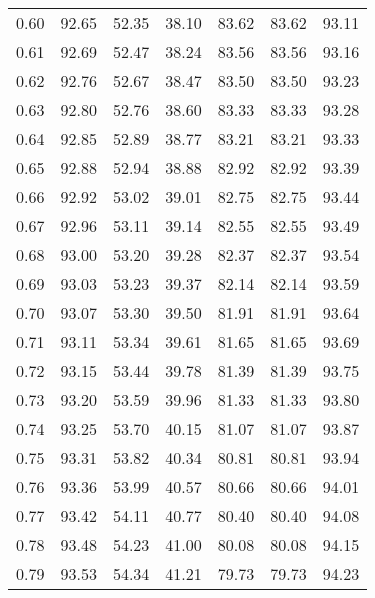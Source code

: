 \begin{tabular}{|c|c|c|c|c|c|c|}
      0.60 &     92.65 &     52.35 &      38.10 &   83.62 &      83.62 &         93.11 \\
      0.61 &     92.69 &     52.47 &      38.24 &   83.56 &      83.56 &         93.16 \\
      0.62 &     92.76 &     52.67 &      38.47 &   83.50 &      83.50 &         93.23 \\
      0.63 &     92.80 &     52.76 &      38.60 &   83.33 &      83.33 &         93.28 \\
      0.64 &     92.85 &     52.89 &      38.77 &   83.21 &      83.21 &         93.33 \\
      0.65 &     92.88 &     52.94 &      38.88 &   82.92 &      82.92 &         93.39 \\
      0.66 &     92.92 &     53.02 &      39.01 &   82.75 &      82.75 &         93.44 \\
      0.67 &     92.96 &     53.11 &      39.14 &   82.55 &      82.55 &         93.49 \\
      0.68 &     93.00 &     53.20 &      39.28 &   82.37 &      82.37 &         93.54 \\
      0.69 &     93.03 &     53.23 &      39.37 &   82.14 &      82.14 &         93.59 \\
      0.70 &     93.07 &     53.30 &      39.50 &   81.91 &      81.91 &         93.64 \\
      0.71 &     93.11 &     53.34 &      39.61 &   81.65 &      81.65 &         93.69 \\
      0.72 &     93.15 &     53.44 &      39.78 &   81.39 &      81.39 &         93.75 \\
      0.73 &     93.20 &     53.59 &      39.96 &   81.33 &      81.33 &         93.80 \\
      0.74 &     93.25 &     53.70 &      40.15 &   81.07 &      81.07 &         93.87 \\
      0.75 &     93.31 &     53.82 &      40.34 &   80.81 &      80.81 &         93.94 \\
      0.76 &     93.36 &     53.99 &      40.57 &   80.66 &      80.66 &         94.01 \\
      0.77 &     93.42 &     54.11 &      40.77 &   80.40 &      80.40 &         94.08 \\
      0.78 &     93.48 &     54.23 &      41.00 &   80.08 &      80.08 &         94.15 \\
      0.79 &     93.53 &     54.34 &      41.21 &   79.73 &      79.73 &         94.23 \\

\end{tabular}
